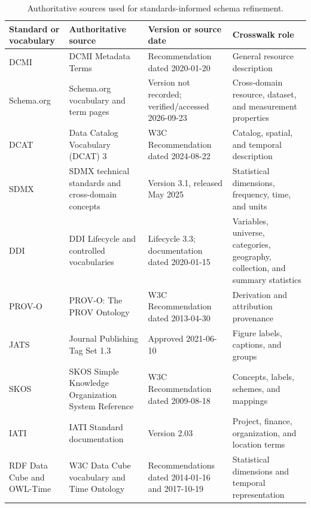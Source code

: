 \documentclass{article}
\begin{document}
\begin{table}[!ht]
    \centering
    \caption{Authoritative sources used for standards-informed schema refinement.}
    \label{tab:standards_sources}
    \renewcommand{\arraystretch}{1.15}
    \scriptsize
    \begin{tabularx}{\textwidth}{>{\RaggedRight\arraybackslash}p{} >{\RaggedRight\arraybackslash}p{} >{\RaggedRight\arraybackslash}p{} >{\RaggedRight\arraybackslash}X}
        \toprule
        \textbf{Standard or vocabulary} & \textbf{Authoritative source} & \textbf{Version or source date} & \textbf{Crosswalk role} \\
        \midrule
        DCMI & DCMI Metadata Terms~\citep{dcmi2020terms} & Recommendation dated 2020-01-20 & General resource description \\
        Schema.org & Schema.org vocabulary and term pages~\citep{schemaorg2026} & Version not recorded; verified/accessed 2026-09-23 & Cross-domain resource, dataset, and measurement properties \\
        DCAT & Data Catalog Vocabulary (DCAT) 3~\citep{albertoni2024dcat3} & W3C Recommendation dated 2024-08-22 & Catalog, spatial, and temporal description \\
        SDMX & SDMX technical standards and cross-domain concepts~\citep{sdmx2025standards} & Version 3.1, released May 2025 & Statistical dimensions, frequency, time, and units \\
        DDI & DDI Lifecycle and controlled vocabularies~\citep{ddi2020lifecycle33} & Lifecycle 3.3; documentation dated 2020-01-15 & Variables, universe, categories, geography, collection, and summary statistics \\
        PROV-O & PROV-O: The PROV Ontology~\citep{lebo2013provo} & W3C Recommendation dated 2013-04-30 & Derivation and attribution provenance \\
        JATS & Journal Publishing Tag Set 1.3~\citep{niso2021jats13} & Approved 2021-06-10 & Figure labels, captions, and groups \\
        SKOS & SKOS Simple Knowledge Organization System Reference~\citep{miles2009skos} & W3C Recommendation dated 2009-08-18 & Concepts, labels, schemes, and mappings \\
        IATI & IATI Standard documentation~\citep{iati203} & Version 2.03 & Project, finance, organization, and location terms \\
        RDF Data Cube and OWL-Time & W3C Data Cube vocabulary and Time Ontology~\citep{cyganiak2014datacube,cox2017owltime} & Recommendations dated 2014-01-16 and 2017-10-19 & Statistical dimensions and temporal representation \\

\end{tabularx}
\end{table}
\end{document}
